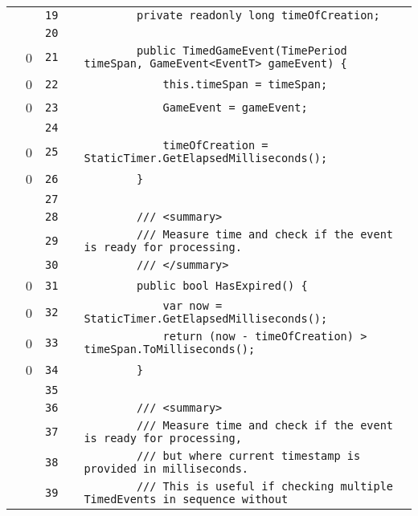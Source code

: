\documentclass[a4paper,landscape,10pt]{article}
\begin{document}
\begin{longtable}[l]{lrrll}
\cellcolor{gray} &  & \verb~19~ & & \verb~        private readonly long timeOfCreation;~\\
\cellcolor{gray} &  & \verb~20~ & & \verb~~\\
\cellcolor{red} & 0 & \verb~21~ & & \verb~        public TimedGameEvent(TimePeriod timeSpan, GameEvent<EventT> gameEvent) {~\\
\cellcolor{red} & 0 & \verb~22~ & & \verb~            this.timeSpan = timeSpan;~\\
\cellcolor{red} & 0 & \verb~23~ & & \verb~            GameEvent = gameEvent;~\\
\cellcolor{gray} &  & \verb~24~ & & \verb~~\\
\cellcolor{red} & 0 & \verb~25~ & & \verb~            timeOfCreation = StaticTimer.GetElapsedMilliseconds();~\\
\cellcolor{red} & 0 & \verb~26~ & & \verb~        }~\\
\cellcolor{gray} &  & \verb~27~ & & \verb~~\\
\cellcolor{gray} &  & \verb~28~ & & \verb~        /// <summary>~\\
\cellcolor{gray} &  & \verb~29~ & & \verb~        /// Measure time and check if the event is ready for processing.~\\
\cellcolor{gray} &  & \verb~30~ & & \verb~        /// </summary>~\\
\cellcolor{red} & 0 & \verb~31~ & & \verb~        public bool HasExpired() {~\\
\cellcolor{red} & 0 & \verb~32~ & & \verb~            var now = StaticTimer.GetElapsedMilliseconds();~\\
\cellcolor{red} & 0 & \verb~33~ & & \verb~            return (now - timeOfCreation) > timeSpan.ToMilliseconds();~\\
\cellcolor{red} & 0 & \verb~34~ & & \verb~        }~\\
\cellcolor{gray} &  & \verb~35~ & & \verb~~\\
\cellcolor{gray} &  & \verb~36~ & & \verb~        /// <summary>~\\
\cellcolor{gray} &  & \verb~37~ & & \verb~        /// Measure time and check if the event is ready for processing,~\\
\cellcolor{gray} &  & \verb~38~ & & \verb~        /// but where current timestamp is provided in milliseconds.~\\
\cellcolor{gray} &  & \verb~39~ & & \verb~        /// This is useful if checking multiple TimedEvents in sequence without~\\

\end{longtable}
\end{document}
